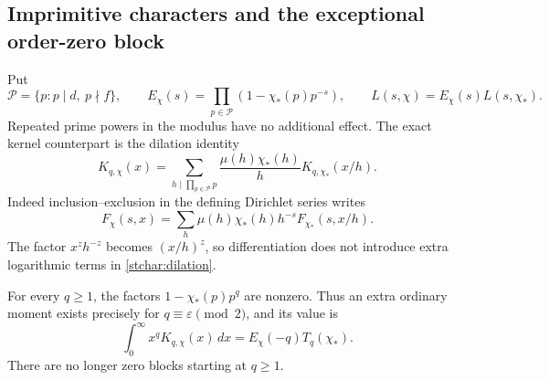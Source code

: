 \subsection{Imprimitive characters and the exceptional order-zero block}

Put
\begin{equation}\label{stchar:euler-factor}
 \mathcal P=\{p:p\mid d,\ p\nmid f\},\qquad
 E_\chi(s)=\prod_{p\in\mathcal P}(1-\chi_*(p)p^{-s}),\qquad
 L(s,\chi)=E_\chi(s)L(s,\chi_*).
\end{equation}
Repeated prime powers in the modulus have no additional effect.
The exact kernel counterpart is the dilation identity
\begin{equation}\label{stchar:dilation}
 K_{q,\chi}(x)=
 \sum_{h\mid\prod_{p\in\mathcal P}p}
       \frac{\mu(h)\chi_*(h)}h K_{q,\chi_*}(x/h).
\end{equation}
Indeed inclusion--exclusion in the defining Dirichlet series writes
\[
 F_\chi(s,x)=\sum_h\mu(h)\chi_*(h)h^{-s}F_{\chi_*}(s,x/h).
\]
The factor $x^zh^{-z}$ becomes $(x/h)^z$, so differentiation
does not introduce extra logarithmic terms in \eqref{stchar:dilation}.

For every $q\ge1$, the factors $1-\chi_*(p)p^q$ are nonzero.
Thus an extra ordinary moment exists precisely for
$q\equiv\varepsilon\pmod2$, and its value is
\begin{equation}\label{stchar:imprimitive-moment}
 \int_0^\infty x^qK_{q,\chi}(x)\,dx
     =E_\chi(-q)T_q(\chi_*).
\end{equation}
There are no longer zero blocks starting at $q\ge1$.

